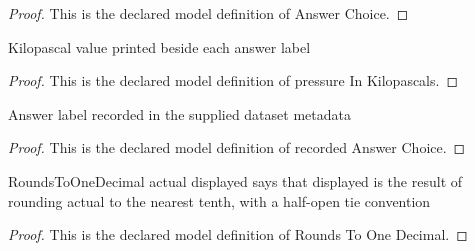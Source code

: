 \begin{proof}
  This is the declared model definition of Answer Choice.
\end{proof}
\begin{definition}
  \label{def:physics:phyx-mini-0441:phyxminiproblems-problemphyxmini0441-answerchoice-pressureinkilopascals}
  Kilopascal value printed beside each answer label
\end{definition}
\begin{proof}
  This is the declared model definition of pressure In Kilopascals.
\end{proof}
\begin{definition}
  \label{def:physics:phyx-mini-0441:phyxminiproblems-problemphyxmini0441-recordedanswerchoice}
  Answer label recorded in the supplied dataset metadata
\end{definition}
\begin{proof}
  This is the declared model definition of recorded Answer Choice.
\end{proof}
\begin{definition}
  \label{def:physics:phyx-mini-0441:phyxminiproblems-problemphyxmini0441-roundstoonedecimal}
  RoundsToOneDecimal actual displayed says that displayed is the result of rounding actual to the nearest tenth, with a half-open tie convention
\end{definition}
\begin{proof}
  This is the declared model definition of Rounds To One Decimal.
\end{proof}
